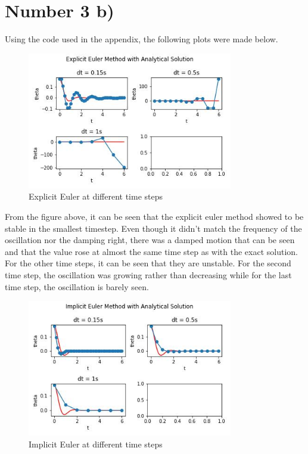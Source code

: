 \documentclass{article}
\begin{document}
	\section*{Number 3 b)}
		Using the code used in the appendix, the following plots were made below.
		\begin{figure}[H]
			\centering
			\includegraphics[width=0.8\textwidth]{images/exp3b.jpg}
			\caption{\label{} Explicit Euler at different time steps}
		\end{figure}
		From the figure above, it can be seen that the explicit euler method showed to be stable in the smallest timestep. Even though it didn't match the frequency of the oscillation nor the damping right, there was a damped motion that can be seen and that the value rose at almost the same time step as with the exact solution. For the other time steps, it can be seen that they are unstable. For the second time step, the oscillation was growing rather than decreasing while for the last time step, the oscillation is barely seen.
		\begin{figure}[H]
			\centering
			\includegraphics[width=0.8\textwidth]{images/imp3b.jpg}
			\caption{\label{} Implicit Euler at different time steps }
		\end{figure}
\end{document}
